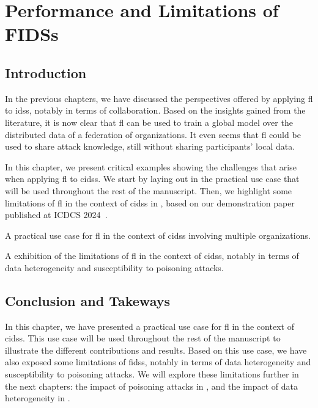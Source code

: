 \chapter{Performance and Limitations of FIDSs\label{chap:application}}

\section{Introduction\label{sec:app.intro}}

In the previous chapters, we have discussed the perspectives offered by applying \gls{fl} to \glspl{ids}, notably in terms of collaboration.
Based on the insights gained from the literature, it is now clear that \gls{fl} can be used to train a global model over the distributed data of a federation of organizations.
It even seems that \gls{fl} could be used to share attack knowledge, still without sharing participants' local data.

In this chapter, we present critical examples showing the challenges that arise when applying \gls{fl} to \glspl{cids}.
We start by laying out in  the practical use case that will be used throughout the rest of the manuscript.
Then, we highlight some limitations of \gls{fl} in the context of \glspl{cids} in , based on our demonstration paper published at ICDCS 2024~\cite{lavaur_icdcs_demo_2024}.

\begin{contribs}
  \item A practical use case for \gls{fl} in the context of \glspl{cids} involving multiple organizations.
  \item A exhibition of the limitations of \gls{fl} in the context of \glspl{cids}, notably in terms of data heterogeneity and susceptibility to poisoning attacks.  
\end{contribs}





%


\section{Conclusion and Takeways\label{sec:app.conclusion}}

In this chapter, we have presented a practical use case for \gls{fl} in the context of \glspl{cids}.
This use case will be used throughout the rest of the manuscript to illustrate the different contributions and results.
Based on this use case, we have also exposed some limitations of \glspl{fids}, notably in terms of data heterogeneity and susceptibility to poisoning attacks.
We will explore these limitations further in the next chapters: the impact of poisoning attacks in , and the impact of data heterogeneity in .